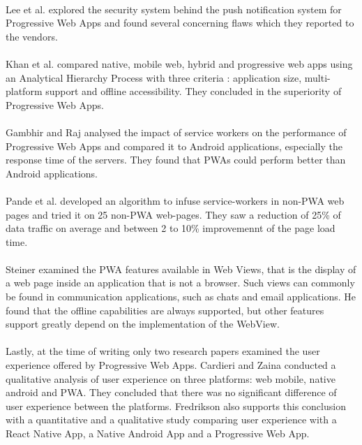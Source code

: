 \documentclass{kththesis}
\begin{document}
\paragraph{}
Lee et al. \cite{Pride_Prejudice} explored the security system behind the push notification system for Progressive Web Apps and found several concerning flaws which they reported to the vendors.

\paragraph{}
Khan et al. \cite{pwa_ahp} compared native, mobile web, hybrid and progressive web apps using an Analytical Hierarchy Process with three criteria : application size, multi-platform support and offline accessibility. They concluded in the superiority of Progressive Web Apps.


\paragraph{}
Gambhir and Raj \cite{gambhir2018analysis} analysed the impact of service workers on the performance of Progressive Web Apps and compared it to Android applications, especially the response time of the servers. They found that PWAs could perform better than Android applications.

\paragraph{}
Pande et al. developed an algorithm to infuse service-workers in non-PWA web pages and tried it on 25 non-PWA web-pages. They saw a reduction of 25\% of data traffic on average and between 2 to 10\% improvemennt of the page load time.

\paragraph{}
Steiner \cite{steiner2018web} examined the PWA features available in Web Views, that is the display of a web page inside an application that is not a browser. Such views can commonly be found in communication applications, such as chats and email applications. He found that the offline capabilities are always supported, but other features support greatly depend on the implementation of the WebView.

\paragraph{}
Lastly, at the time of writing only two research papers examined the user experience offered by Progressive Web Apps. Cardieri and Zaina \cite{PWA_UX_comparison_study} conducted a qualitative analysis of user experience on three platforms: web mobile, native android and PWA. They concluded that there was no significant difference of user experience between the platforms. Fredrikson \cite{emulating_native_w_crossplatform} also supports this conclusion with a quantitative and a qualitative study comparing user experience with a React Native App, a Native Android App and a Progressive Web App. 
\end{document}
